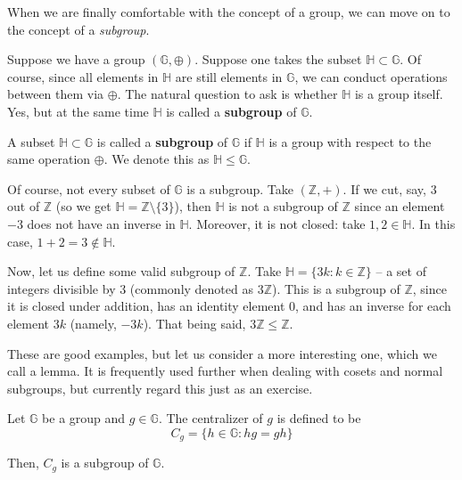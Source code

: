 \documentclass[../lecture-notes.tex]{subfiles}
\begin{document}
When we are finally comfortable with the concept of a group, we can move on to the concept of a \textit{subgroup}. 

Suppose we have a group $(\mathbb{G},\oplus)$. Suppose one takes the subset $\mathbb{H} \subset \mathbb{G}$. Of course, since all elements in $\mathbb{H}$ are still elements in $\mathbb{G}$, we can conduct operations between them via $\oplus$. 
The natural question to ask is whether $\mathbb{H}$ is a group itself. Yes, but at the same time $\mathbb{H}$ is called a \textbf{subgroup} of $\mathbb{G}$.

\begin{definition}
    A subset $\mathbb{H} \subset \mathbb{G}$ is called a \textbf{subgroup} of $\mathbb{G}$ if $\mathbb{H}$ is a group with respect to the same operation $\oplus$. We denote this as $\mathbb{H} \leq \mathbb{G}$.
\end{definition}

\begin{example}
    Of course, not every subset of $\mathbb{G}$ is a subgroup. Take $(\mathbb{Z}, +)$. If we cut, say, $3$ out of $\mathbb{Z}$ (so we get $\mathbb{H} = \mathbb{Z} \setminus \{3\}$), then $\mathbb{H}$ is not a subgroup of $\mathbb{Z}$ since an element $-3$ does not have an inverse in $\mathbb{H}$. Moreover, it is not closed: take $1,2 \in \mathbb{H}$. In this case, $1+2 = 3 \notin \mathbb{H}$.
\end{example}

\begin{example}
    Now, let us define some valid subgroup of $\mathbb{Z}$. Take $\mathbb{H} = \{3k: k \in \mathbb{Z}\}$ -- a set of integers divisible by $3$ (commonly denoted as $3\mathbb{Z}$). This is a subgroup of $\mathbb{Z}$, since it is closed under addition, has an identity element $0$, and has an inverse for each element $3k$ (namely, $-3k$). That being said, $3\mathbb{Z} \leq \mathbb{Z}$.
\end{example}

These are good examples, but let us consider a more interesting one, which we call a lemma. It is frequently used further when dealing with cosets and normal subgroups, but currently regard this just as an exercise.
\begin{lemma}
    Let $\mathbb{G}$ be a group and $g \in \mathbb{G}$. The centralizer of $g$ is defined to be
    \begin{equation}
        C_g = \{h \in \mathbb{G}: h g = g h\}
    \end{equation}

    Then, $C_g$ is a subgroup of $\mathbb{G}$.
\end{lemma}
\end{document}
